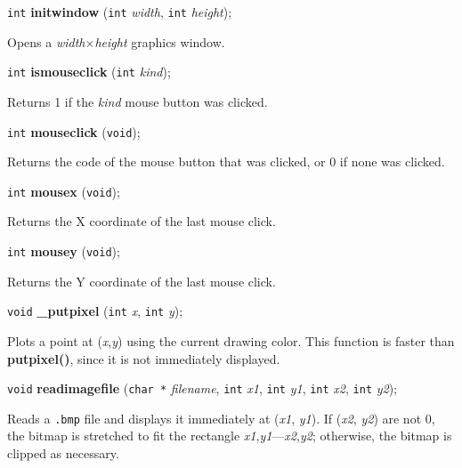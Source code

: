 \documentclass[a4paper,11pt]{article}
\newcommand{\V}{\texttt{void}}      %
\newcommand{\I}{\texttt{int}}       %
\newcommand{\C}{\texttt{char *}}    %
\newcommand{\func}[1]{\textbf{#1}}  %
\newcommand{\A}[1]{\emph{#1}}       %
\newcommand{\F}[1]{\texttt{#1}}     %
\newenvironment{bgi}
{ %
  \begin{snugshade}
}
{ %
  \end{snugshade}
}
\begin{document}

\begin{bgi}
\I{} \func{initwindow} (\I{} \A{width}, \I{} \A{height});
\end{bgi}

Opens a \A{width}$\times$\A{height} graphics window.


\begin{bgi}
\I{} \func{ismouseclick} (\I{} \A{kind});
\end{bgi}

Returns 1 if the \A{kind} mouse button was clicked.


\begin{bgi}
\I{} \func{mouseclick} (\V{});
\end{bgi}

Returns the code of the mouse button that was clicked, or 0 if none
was clicked.


\begin{bgi}
\I{} \func{mousex} (\V{});
\end{bgi}

Returns the X coordinate of the last mouse click.


\begin{bgi}
\I{} \func{mousey} (\V{});
\end{bgi}

Returns the Y coordinate of the last mouse click.


\begin{bgi}
\V{} \func{\_putpixel} (\I{} \A{x}, \I{} \A{y}); 
\end{bgi}

Plots a point at (\A{x},\A{y}) using the current drawing color. This
function is faster than \func{putpixel()}, since it is not immediately
displayed.


\begin{bgi}
\V{} \func{readimagefile} (\C{} \A{filename}, \I{} \A{x1}, \I{} \A{y1}, 
\I{} \A{x2}, \I{} \A{y2});
\end{bgi}

Reads a \F{.bmp} file and displays it immediately at (\A{x1}, \A{y1}).
If (\A{x2}, \A{y2}) are not 0, the bitmap is stretched to fit the
rectangle \A{x1},\A{y1}---\A{x2},\A{y2}; otherwise, the bitmap is
clipped as necessary.
\end{document}
